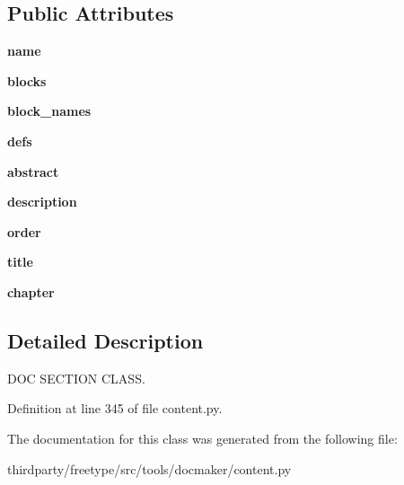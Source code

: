 \subsection*{Public Attributes}
\begin{DoxyCompactItemize}
\item 
\mbox{\label{classcontent_1_1_doc_section_aa9cb67b2de8f78fadd5b34b2b7d4fddb}} 
{\bfseries name}
\item 
\mbox{\label{classcontent_1_1_doc_section_a6dc9c56aab747332dd19f9172f17d235}} 
{\bfseries blocks}
\item 
\mbox{\label{classcontent_1_1_doc_section_a525935839adec31fb97a4703a8bba0a9}} 
{\bfseries block\+\_\+names}
\item 
\mbox{\label{classcontent_1_1_doc_section_a1525b192e23ba6adbef463b918f8990b}} 
{\bfseries defs}
\item 
\mbox{\label{classcontent_1_1_doc_section_a9961364eb1241e7dc04328df9d94bb32}} 
{\bfseries abstract}
\item 
\mbox{\label{classcontent_1_1_doc_section_ab3891954b06247b968138f9e237dbe6e}} 
{\bfseries description}
\item 
\mbox{\label{classcontent_1_1_doc_section_ac22720e5560ff80c0b6ca417e7147772}} 
{\bfseries order}
\item 
\mbox{\label{classcontent_1_1_doc_section_ae71dcdfb8cf258b8a3fe08f932ba034a}} 
{\bfseries title}
\item 
\mbox{\label{classcontent_1_1_doc_section_afde8faed627afff80100425031a6a596}} 
{\bfseries chapter}
\end{DoxyCompactItemize}


\subsection{Detailed Description}
D\+OC S\+E\+C\+T\+I\+ON C\+L\+A\+SS. 

Definition at line 345 of file content.\+py.



The documentation for this class was generated from the following file\+:\begin{DoxyCompactItemize}
\item 
thirdparty/freetype/src/tools/docmaker/content.\+py\end{DoxyCompactItemize}
